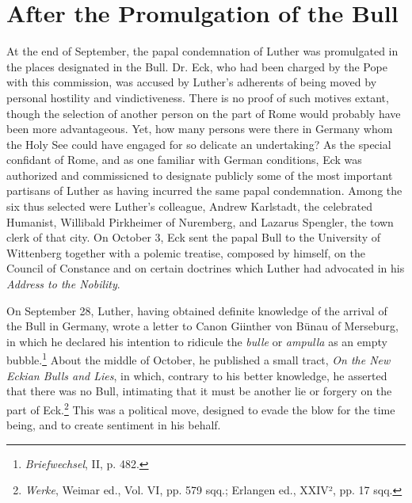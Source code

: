 \section{After the Promulgation of the Bull}

At the end of September, the papal condemnation of Luther was
promulgated in the places designated in the Bull. Dr. Eck, who had
been charged by the Pope with this commission, was accused by
Luther’s adherents of being moved by personal hostility and vindictiveness.
There is no proof of such motives extant, though the selection
of another person on the part of Rome would probably have
been more advantageous. Yet, how many persons were there in Germany whom
the Holy See could have engaged for so delicate an undertaking?
As the special confidant of Rome, and as one familiar with
German conditions, Eck was authorized and commissicned to designate publicly
some of the most important partisans of Luther as having incurred the same
papal condemnation. Among the six thus selected
were Luther’s colleague, Andrew Karlstadt, the celebrated
Humanist, Willibald Pirkheimer of Nuremberg, and Lazarus Spengler, the
town clerk of that city. On October 3, Eck sent the papal
Bull to the University of Wittenberg together with a polemic treatise,
composed by himself, on the Council of Constance and on certain
doctrines which Luther had advocated in his \textit{Address to the Nobility}.

On September 28, Luther, having obtained definite knowledge of
the arrival of the Bull in Germany, wrote a letter to Canon Giinther
von Bünau of Merseburg, in which he declared his intention to ridicule
the \textit{bulle} or \textit{ampulla} as an empty bubble.\footnote{\textit{Briefwechsel}, II, p. 482.}
About the middle of
October, he published a small tract, \textit{On the New Eckian Bulls and
Lies}, in which, contrary to his better knowledge, he asserted that
there was no Bull, intimating that it must be another lie or
forgery on the part of Eck.\footnote
{\textit{Werke}, Weimar ed., Vol. VI, pp. 579 sqq.; Erlangen ed., XXIV², pp. 17 sqq.}
This was a political move, designed to
evade the blow for the time being, and to create sentiment in his
behalf.

